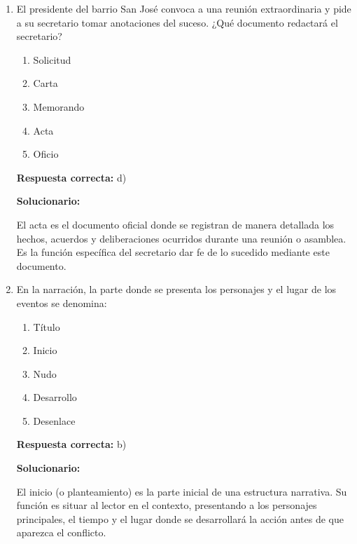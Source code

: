 \begin{enumerate}[resume]
El texto es expositivo porque su intención principal es informar y transmitir datos de manera objetiva sobre un tema específico (la clasificación de los seres vivos según su alimentación), sin intentar convencer al lector ni contar una historia.

\vspace{6mm}

\item El presidente del barrio San José convoca a una reunión extraordinaria y pide a su secretario tomar anotaciones del suceso.
¿Qué documento redactará el secretario?

\begin{enumerate}[label=\alph*)]
	\item Solicitud
	\item Carta
	\item Memorando
	\item Acta
	\item Oficio
\end{enumerate}

\textbf{Respuesta correcta:} d)

\vspace{2mm}
\textbf{Solucionario:}

El acta es el documento oficial donde se registran de manera detallada los hechos, acuerdos y deliberaciones ocurridos durante una reunión o asamblea. Es la función específica del secretario dar fe de lo sucedido mediante este documento.

\vspace{6mm}

\item En la narración, la parte donde se presenta los personajes y el lugar de los eventos se denomina:

\begin{enumerate}[label=\alph*)]
	\item Título
	\item Inicio
	\item Nudo
	\item Desarrollo
	\item Desenlace
\end{enumerate}

\textbf{Respuesta correcta:} b)

\vspace{2mm}
\textbf{Solucionario:}

El inicio (o planteamiento) es la parte inicial de una estructura narrativa. Su función es situar al lector en el contexto, presentando a los personajes principales, el tiempo y el lugar donde se desarrollará la acción antes de que aparezca el conflicto.

\vspace{6mm}
	
\end{enumerate}






